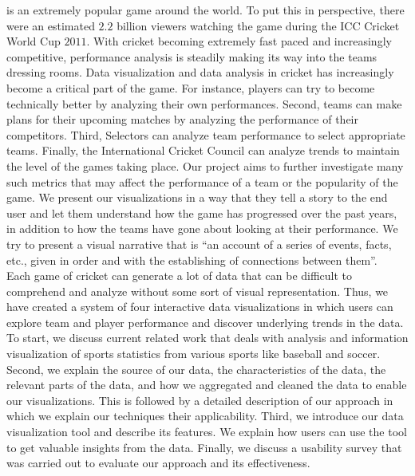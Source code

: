 \documentclass[10pt,journal,compsoc]{IEEEtran}
\begin{document}
% 
% 
% 
% 
 is an extremely popular game around the world. To put this in perspective, there were an estimated $2.2$ billion viewers watching the game during the ICC Cricket World Cup $2011$. With cricket becoming extremely fast paced and increasingly competitive, performance analysis is steadily making its way into the teams dressing rooms. Data visualization and data analysis in cricket has increasingly become a critical part of the game. For instance, players can try to become technically better by analyzing their own performances. Second, teams can make plans for their upcoming matches by analyzing the performance of their competitors. Third, Selectors can analyze team performance to select appropriate teams. Finally, the International Cricket Council can analyze trends to maintain the level of the games taking place. Our project aims to further investigate many such metrics that may affect the performance of a team or the popularity of the game. We present our visualizations in a way that they tell a story to the end user and let them understand how the game has progressed over the past years, in addition to how the teams have gone about looking at their performance. We try to present a visual narrative that is ``an account of a series of events, facts, etc., given in order and with the establishing of connections between them''.\cite{narrative}\\

Each game of cricket can generate a lot of data that can be difficult to comprehend and analyze without some sort of visual representation. Thus, we have created a system of four interactive data visualizations in which users can explore team and player performance and discover underlying trends in the data. To start, we discuss current related work that deals with analysis and information visualization of sports statistics from various sports like baseball and soccer. Second, we explain the source of our data, the characteristics of the data, the relevant parts of the data, and how we aggregated and cleaned the data to enable our visualizations. This is followed by a detailed description of our approach in which we explain our techniques their applicability. Third, we introduce our data visualization tool and describe its features. We explain how users can use the tool to get valuable insights from the data. Finally, we discuss a usability survey that was carried out to evaluate our approach and its effectiveness.
\end{document}

